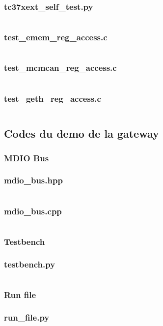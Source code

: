\subsubsection*{tc37xext\_self\_test.py}
\label{anexe:tc37ex:tests:self}
\inputminted[autogobble]{python}{anexes/tc37ex/tests/tc37xext_self_test.py}

\subsubsection*{test\_emem\_reg\_access.c}
\label{anexe:tc37ex:tests:emem_reg_access}
\inputminted[autogobble]{c}{anexes/tc37ex/tests/test_emem_reg_access_ext.c}

\subsubsection*{test\_mcmcan\_reg\_access.c}
\label{anexe:tc37ex:tests:mcmcan_reg_access}
\inputminted[autogobble]{c}{anexes/tc37ex/tests/test_mcmcan_reg_access_ext.c}

\subsubsection*{test\_geth\_reg\_access.c}
\label{anexe:tc37ex:tests:geth_reg_access}
\inputminted[autogobble]{c}{anexes/tc37ex/tests/test_geth_reg_access_ext.c}


\subsection{Codes du demo de la gateway}

\subsubsection{MDIO Bus}
\label{anexe:gw_demo:mdio_bus}
\subsubsection*{mdio\_bus.hpp}
\inputminted[autogobble]{c++}{anexes/Gw_demo/mdio_bus.hpp}
\subsubsection*{mdio\_bus.cpp}
\inputminted[autogobble]{c++}{anexes/Gw_demo/mdio_bus.cpp}

\subsubsection{Testbench}
\label{anexe:gw_demo:testbench}
\subsubsection*{testbench.py}
\inputminted[autogobble]{python}{anexes/Gw_demo/testbench.py}

\subsubsection{Run file}
\label{anexe:gw_demo:run_file}
\subsubsection*{run\_file.py}
\inputminted[autogobble]{python}{anexes/Gw_demo/run_microsar.py}
